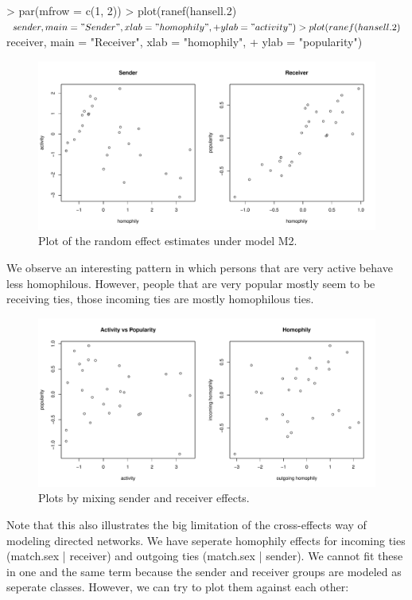 \documentclass[a4paper]{article}
\begin{document}
\begin{Schunk}
\begin{Sinput}
> par(mfrow = c(1, 2))
> plot(ranef(hansell.2)$sender, main = "Sender", xlab = "homophily", 
+     ylab = "activity")
> plot(ranef(hansell.2)$receiver, main = "Receiver", xlab = "homophily", 
+     ylab = "popularity")
\end{Sinput}
\end{Schunk}
\begin{figure}[h!]
\centering
\includegraphics{paper-ranefplotfig}
\caption{Plot of the random effect estimates under model M2.}
\label{ranefplotfig}
\end{figure}
We observe an interesting pattern in which persons that are very active behave less homophilous. However, people that are very popular
mostly seem to be receiving ties, those incoming ties are mostly homophilous ties. \\

\begin{figure}[h!]
\centering
\includegraphics{paper-ranefplotfig2}
\caption{Plots by mixing sender and receiver effects.}
\label{ranefplotfig}
\end{figure}

Note that this also illustrates the big limitation of the cross-effects way of modeling directed networks. We have seperate homophily
effects for incoming ties (match.sex | receiver) and outgoing ties (match.sex | sender). We cannot fit these in one and the same term 
because the sender and receiver groups are modeled as seperate classes. However, we can try to plot them against each other:
\end{document}
